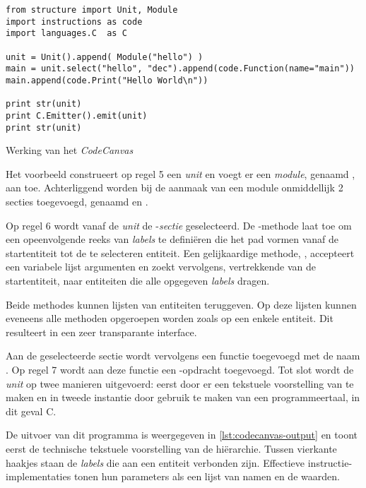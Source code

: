 \begin{listing}[ht]
  \begin{verbatim}
from structure import Unit, Module
import instructions as code
import languages.C  as C

unit = Unit().append( Module("hello") )
main = unit.select("hello", "dec").append(code.Function(name="main"))
main.append(code.Print("Hello World\n"))

print str(unit)
print C.Emitter().emit(unit)
print str(unit)
  \end{verbatim}
  \vspace{-5mm}
  \caption{Werking van het \emph{CodeCanvas}}
  \label{lst:codecanvas-hello}
\end{listing}

Het voorbeeld construeert op regel 5 een \emph{unit} en voegt er een
\emph{module}, genaamd , aan toe. Achterliggend worden bij de
aanmaak van een module onmiddellijk 2 secties toegevoegd, genaamd  en
.

Op regel 6 wordt vanaf de \emph{unit} de -\emph{sectie} geselecteerd.
De -methode laat toe om een opeenvolgende reeks van \emph{labels}
te defini\"eren die het pad vormen vanaf de startentiteit tot de te selecteren
entiteit. Een gelijkaardige methode, , accepteert een variabele lijst
argumenten en zoekt vervolgens, vertrekkende van de startentiteit, naar
entiteiten die alle opgegeven \emph{labels} dragen.

Beide methodes kunnen lijsten van entiteiten teruggeven. Op deze lijsten kunnen
eveneens alle methoden opgeroepen worden zoals op een enkele entiteit. Dit
resulteert in een zeer transparante interface.

Aan de geselecteerde sectie wordt vervolgens een functie toegevoegd met de naam
. Op regel 7 wordt aan deze functie een -opdracht
toegevoegd. Tot slot wordt de \emph{unit} op twee manieren uitgevoerd: eerst
door er een tekstuele voorstelling van te maken en in tweede instantie door
gebruik te maken van een programmeertaal, in dit geval C.

De uitvoer van dit programma is weergegeven in \ref{lst:codecanvas-output} en
toont eerst de technische tekstuele voorstelling van de hi\"erarchie. Tussen
vierkante haakjes staan de \emph{labels} die aan een entiteit verbonden zijn.
Effectieve instructie-implementaties tonen hun parameters als een lijst van
namen en de waarden.

